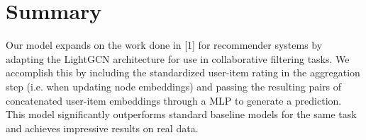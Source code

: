 \documentclass[10pt,conference,compsocconf]{IEEEtran}
\begin{document}
\section{Summary}

Our model expands on the work done in [1] for recommender systems by adapting the LightGCN architecture for use in collaborative filtering tasks. We accomplish this by including the standardized user-item rating in the aggregation step (i.e. when updating node embeddings) and passing the resulting pairs of concatenated user-item embeddings through a MLP to generate a prediction. This model significantly outperforms standard baseline models for the same task and achieves impressive results on real data.



\end{document}

